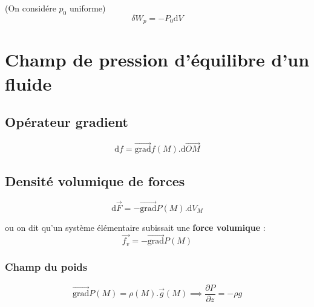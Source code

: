 \documentclass{report}
\begin{document}
(On considére $p_0$ uniforme) 
\begin{equation}
  \delta W _{p} = - P_0 \mathrm{d}V
\end{equation}
\newpage
\section{Champ de pression d'équilibre d'un fluide} %
\label{sec:Champ de pression d'équilibre d'un fluide}




\subsection{Opérateur gradient} %
\label{sub:Opérateur gradient}

\begin{equation}
  \mathrm{d} f = \overrightarrow{\mathrm{grad}} f(M) . \mathrm{d} \overrightarrow{OM}
\end{equation}


\subsection{Densité volumique de forces} %

\begin{equation}
  \mathrm{d} \overrightarrow{F} = - \overrightarrow{\mathrm{grad}} P(M) .\mathrm{d}V_M
\end{equation}

ou on dit qu'un système élémentaire subissait une \textbf{force volumique} : 
\begin{equation}
  \overrightarrow{f_v} = - \overrightarrow{\mathrm{grad}} P(M)
\end{equation}

\subsubsection{Champ du poids} %
\label{sec:Champ du poids}

\begin{equation}
  \overrightarrow{\mathrm{grad}} P(M) = \rho(M) . \overrightarrow{g}(M) \implies \frac{\partial P}{\partial z}  = - \rho g
\end{equation}
\end{document}
